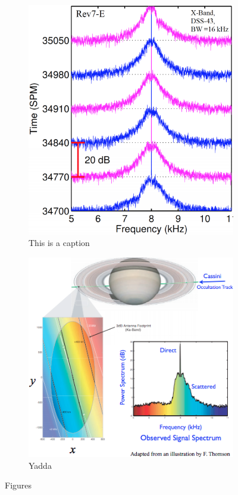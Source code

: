\documentclass[oneside]{book}
\theoremstyle{mystyle}
\begin{document}
\begin{figure}[htbp]
	\centering
	\begin{subfigure}[b]{0.49\textwidth}
    	\includegraphics[width=\textwidth]{USER_7.png}
    	\caption{This is a caption}
    \end{subfigure}
    \begin{subfigure}[b]{0.49\textwidth}
        \includegraphics[width=\textwidth]{USER_7a.png}
        \caption{Yadda}
    \end{subfigure}
    \caption{Figures}
    \label{other_label_2}
\end{figure}
\end{document}
